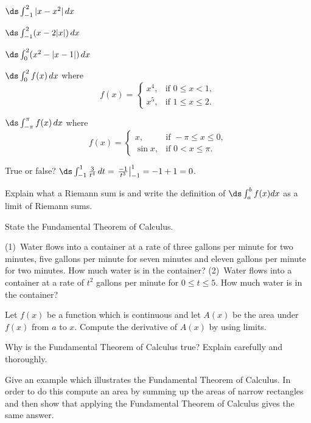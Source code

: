 \begin{multicols}{2}
  \problem$\ds \int^2_{-1} |x-x^2| \,dx$


  \problem$\ds \int^2_{-1} (x-2|x|) \,dx$


  \problem$\ds \int^2_{0} (x^2-|x-1|) \,dx$




  \problem $\ds \int^2_{0} f(x) \,dx$ where
  \[
  f(x) =
  \begin{cases}
    x^4,  &\text{if } 0\le x<1,\\
    x^5, &\text{if } 1\le x\le 2.
  \end{cases}
  \]




  \problem $\ds \int^\pi_{-\pi} f(x) \,dx$ where
  \[
  f(x) =
  \begin{cases}
    x,&\text{if } -\pi\le x\le 0,\\
    \sin x, & \text{if } 0< x\le \pi.
  \end{cases}
  \]




  \problem True or false?  $\ds\int^1_{-1} \frac{3}{t^4}
  \,dt=\left.\frac{-1}{t^3}\right|_{-1}^1=-1+1=0$.



  \problem Explain what a Riemann sum is and write the definition of $\ds
  \int_a^b f(x) dx $ as a limit of Riemann sums.





  \problem State the Fundamental Theorem of Calculus.



  \problem (1)~Water flows into a container at a rate of three gallons per
  minute for two minutes, five gallons per minute for seven minutes and
  eleven gallons per minute for two minutes.  How much water is in the
  container?  (2)~Water flows into a container at a rate of $t^2$ gallons per
  minute for $0\le t\le 5$.  How much water is in the container?




  \problem Let $f(x)$ be a function which is continuous and let $A(x)$ be the
  area under $f(x)$ from $a$ to $x$.  Compute the derivative of $A(x)$ by
  using limits.




  \problem Why is the Fundamental Theorem of Calculus true?  Explain
  carefully and thoroughly.




  \problem Give an example which illustrates the Fundamental Theorem of
  Calculus.  In order to do this compute an area by summing up the areas of
  narrow rectangles and then show that applying the Fundamental Theorem of
  Calculus gives the same answer.






\end{multicols}
